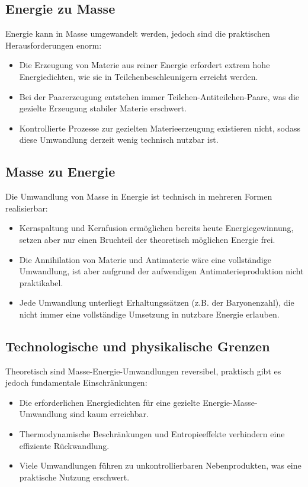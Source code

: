 \documentclass{article}
\begin{document}
\subsection{Energie zu Masse}
Energie kann in Masse umgewandelt werden, jedoch sind die praktischen Herausforderungen enorm:
\begin{itemize}
	\item Die Erzeugung von Materie aus reiner Energie erfordert extrem hohe Energiedichten, wie sie in Teilchenbeschleunigern erreicht werden.
	\item Bei der Paarerzeugung entstehen immer Teilchen-Antiteilchen-Paare, was die gezielte Erzeugung stabiler Materie erschwert.
	\item Kontrollierte Prozesse zur gezielten Materieerzeugung existieren nicht, sodass diese Umwandlung derzeit wenig technisch nutzbar ist.
\end{itemize}

\subsection{Masse zu Energie}
Die Umwandlung von Masse in Energie ist technisch in mehreren Formen realisierbar:
\begin{itemize}
	\item Kernspaltung und Kernfusion ermöglichen bereits heute Energiegewinnung, setzen aber nur einen Bruchteil der theoretisch möglichen Energie frei.
	\item Die Annihilation von Materie und Antimaterie wäre eine vollständige Umwandlung, ist aber aufgrund der aufwendigen Antimaterieproduktion nicht praktikabel.
	\item Jede Umwandlung unterliegt Erhaltungssätzen (z.B. der Baryonenzahl), die nicht immer eine vollständige Umsetzung in nutzbare Energie erlauben.
\end{itemize}

\subsection{Technologische und physikalische Grenzen}
Theoretisch sind Masse-Energie-Umwandlungen reversibel, praktisch gibt es jedoch fundamentale Einschränkungen:
\begin{itemize}
	\item Die erforderlichen Energiedichten für eine gezielte Energie-Masse-Umwandlung sind kaum erreichbar.
	\item Thermodynamische Beschränkungen und Entropieeffekte verhindern eine effiziente Rückwandlung.
	\item Viele Umwandlungen führen zu unkontrollierbaren Nebenprodukten, was eine praktische Nutzung erschwert.
\end{itemize}
\end{document}
